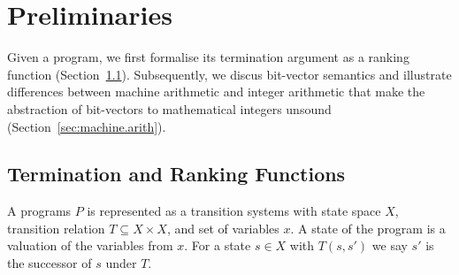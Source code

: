 \documentclass[preprint]{sigplanconf}
\theoremstyle{definition}
\begin{document}





\section{Preliminaries}
Given a program, %
we first formalise its termination argument as a ranking function
(Section~\ref{sec:ranking.functions}).  Subsequently, we discus bit-vector
semantics and illustrate differences between machine arithmetic and integer
arithmetic that make the abstraction of bit-vectors to mathematical integers
unsound (Section~\ref{sec:machine.arith}).

\subsection{Termination and Ranking Functions} \label{sec:ranking.functions}
A programs $P$ is represented as a transition systems with state space $X$, transition relation $T \subseteq X \times X$, and set of variables $x$. 
A state of the program is a valuation of the variables from $x$. For a state $s \in X$ with $T(s,s')$ we say $s'$
is the successor of $s$ under $T$. 
\end{document}
